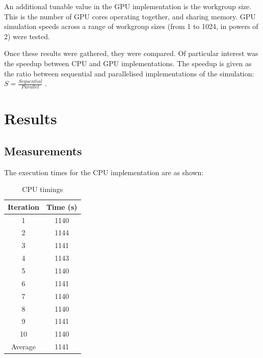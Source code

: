 \documentclass[journal,transmag]{IEEEtran}
\begin{document}
    An additional tunable value in the GPU implementation is the workgroup size. This is the number of GPU cores
    operating together, and sharing memory. GPU simulation speeds across a range of workgroup sizes (from 1 to
    1024, in powers of 2) were tested.

    Once these results were gathered, they were compared. Of particular interest was the speedup between CPU and GPU
    implementations. The speedup is given as the ratio between sequential and parallelised implementations of the
    simulation: $ S = \frac{Sequential}{Parallel} $ .

    \section{Results}
        \subsection{Measurements}
        The execution times for the CPU implementation are as shown:
        \begin{table}[h]
            \centering
            \caption{CPU timings}
            \label{CPUTable}
            \begin{tabular}{ c c }
                Iteration & Time (s) \\
                \hline
                \hline
                1         & 1140 \\
                2         & 1144 \\
                3         & 1141 \\
                4         & 1143 \\
                5         & 1140 \\
                6         & 1141 \\
                7         & 1140 \\
                8         & 1140 \\
                9         & 1141 \\
                10        & 1140 \\
                \hline
                Average   & 1141 \\
            \end{tabular}
        \end{table}
\end{document}
